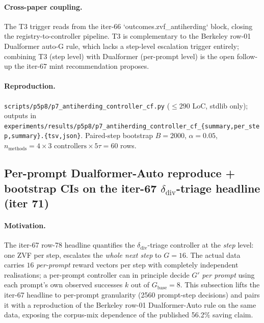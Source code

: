 \paragraph{Cross-paper coupling.}
The T3 trigger reads from the iter-66 `outcomes.zvf\_antiherding` block,
closing the registry-to-controller pipeline. T3 is complementary to the
Berkeley row-01 Dualformer auto-G rule, which lacks a step-level
escalation trigger entirely; combining T3 (step level) with Dualformer
(per-prompt level) is the open follow-up the iter-67 mint
recommendation proposes.

\paragraph{Reproduction.}
\texttt{scripts/p5p8/p7\_antiherding\_controller\_cf.py}
($\leq 290$ LoC, stdlib only); outputs in
\texttt{experiments/results/p5p8/p7\_antiherding\_controller\_cf\_\{summary,per\_step,summary\}.\{tsv,json\}}.
Paired-step bootstrap $B{=}2000$, $\alpha{=}0.05$,
$n_{\mathrm{methods}}{=}4 \times 3 \text{ controllers} \times 5 \tau = 60$ rows.

\subsection{Per-prompt Dualformer-Auto reproduce + bootstrap CIs on
the iter-67 $\delta_{\mathrm{div}}$-triage headline (iter 71)}
\label{sec:p7-per-prompt-dualformer}

\paragraph{Motivation.}
The iter-67 row-78 headline quantifies the $\delta_{\mathrm{div}}$-triage
controller at the \emph{step} level: one ZVF per step, escalates the
\emph{whole next step} to $G{=}16$. The actual data carries $16$
\emph{per-prompt} reward vectors per step with completely independent
realisations; a per-prompt controller can in principle decide $G'$
\emph{per prompt} using each prompt's own observed successes $k$
out of $G_\text{base}{=}8$. This subsection lifts the iter-67 headline
to per-prompt granularity (2560 prompt-step decisions) and pairs it
with a reproduction of the Berkeley row-01 Dualformer-Auto rule on the
same data, exposing the corpus-mix dependence of the published 56.2\%
saving claim.

